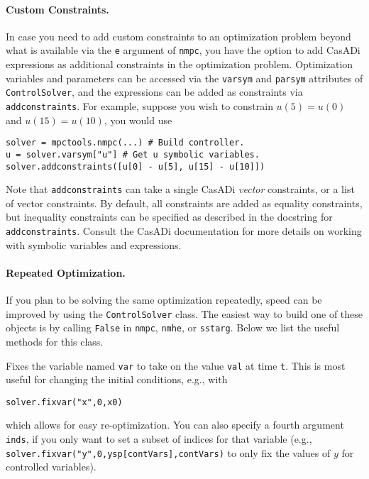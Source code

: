 \documentclass{article}
\begin{document}
\begin{multicols}{2}
\paragraph*{Custom Constraints.}

In case you need to add custom constraints to an optimization problem beyond what is available via the \lstinline|e| argument of \lstinline|nmpc|, you have the option to add CasADi expressions as additional constraints in the optimization problem.
Optimization variables and parameters can be accessed via the \lstinline|varsym| and \lstinline|parsym| attributes of \lstinline|ControlSolver|, and the expressions can be added as constraints via \lstinline|addconstraints|.
For example, suppose you wish to constrain $u(5) = u(0)$ and $u(15) = u(10)$, you would use
%
\begin{lstlisting}
solver = mpctools.nmpc(...) # Build controller.
u = solver.varsym["u"] # Get u symbolic variables.
solver.addconstraints([u[0] - u[5], u[15] - u[10]])
\end{lstlisting}
%
Note that \lstinline|addconstraints| can take a single CasADi \emph{vector} constraints, or a list of vector constraints.
By default, all constraints are added as equality constraints, but inequality constraints can be specified as described in the docstring for \lstinline|addconstraints|.
Consult the CasADi documentation for more details on working with symbolic variables and expressions.

\paragraph*{Repeated Optimization.}

If you plan to be solving the same optimization repeatedly, speed can be improved by using the \texttt{ControlSolver} class.
The easiest way to build one of these objects is by calling \texttt{False} in \texttt{nmpc}, \texttt{nmhe}, or \texttt{sstarg}.
Below we list the useful methods for this class.


Fixes the variable named \texttt{var} to take on the value \texttt{val} at time \texttt{t}.
This is most useful for changing the initial conditions, e.g., with
%
\begin{lstlisting}
solver.fixvar("x",0,x0)
\end{lstlisting}
%
which allows for easy re-optimization.
You can also specify a fourth argument \texttt{inds}, if you only want to set a subset of indices for that variable (e.g., \lstinline|solver.fixvar("y",0,ysp[contVars],contVars)| to only fix the values of $y$ for controlled variables).


\end{multicols}
\end{document}
